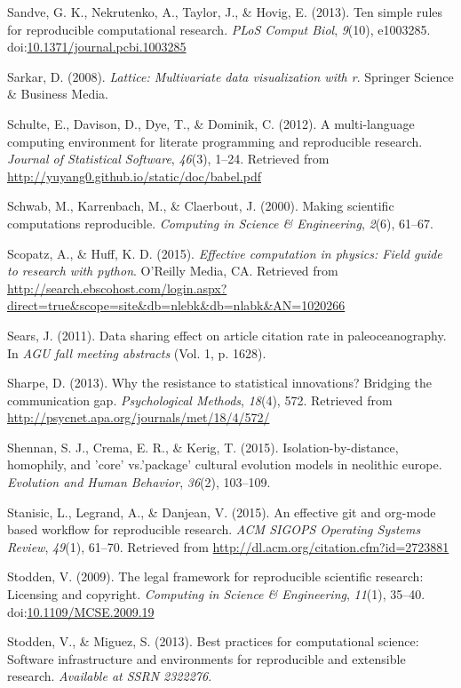 \documentclass[american,man]{apa6}
\begin{document}
Sandve, G. K., Nekrutenko, A., Taylor, J., \& Hovig, E. (2013). Ten
simple rules for reproducible computational research. \emph{PLoS Comput
Biol}, \emph{9}(10), e1003285.
doi:\href{http://dx.doi.org/10.1371/journal.pcbi.1003285}{10.1371/journal.pcbi.1003285}

Sarkar, D. (2008). \emph{Lattice: Multivariate data visualization with
r}. Springer Science \& Business Media.

Schulte, E., Davison, D., Dye, T., \& Dominik, C. (2012). A
multi-language computing environment for literate programming and
reproducible research. \emph{Journal of Statistical Software},
\emph{46}(3), 1--24. Retrieved from
\url{http://yuyang0.github.io/static/doc/babel.pdf}

Schwab, M., Karrenbach, M., \& Claerbout, J. (2000). Making scientific
computations reproducible. \emph{Computing in Science \& Engineering},
\emph{2}(6), 61--67.

Scopatz, A., \& Huff, K. D. (2015). \emph{Effective computation in
physics: Field guide to research with python}. O'Reilly Media, CA.
Retrieved from
\url{http://search.ebscohost.com/login.aspx?direct=true\&scope=site\&db=nlebk\&db=nlabk\&AN=1020266}

Sears, J. (2011). Data sharing effect on article citation rate in
paleoceanography. In \emph{AGU fall meeting abstracts} (Vol. 1, p.
1628).

Sharpe, D. (2013). Why the resistance to statistical innovations?
Bridging the communication gap. \emph{Psychological Methods},
\emph{18}(4), 572. Retrieved from
\url{http://psycnet.apa.org/journals/met/18/4/572/}

Shennan, S. J., Crema, E. R., \& Kerig, T. (2015).
Isolation-by-distance, homophily, and 'core' vs.'package' cultural
evolution models in neolithic europe. \emph{Evolution and Human
Behavior}, \emph{36}(2), 103--109.

Stanisic, L., Legrand, A., \& Danjean, V. (2015). An effective git and
org-mode based workflow for reproducible research. \emph{ACM SIGOPS
Operating Systems Review}, \emph{49}(1), 61--70. Retrieved from
\url{http://dl.acm.org/citation.cfm?id=2723881}

Stodden, V. (2009). The legal framework for reproducible scientific
research: Licensing and copyright. \emph{Computing in Science \&
Engineering}, \emph{11}(1), 35--40.
doi:\href{http://dx.doi.org/10.1109/MCSE.2009.19}{10.1109/MCSE.2009.19}

Stodden, V., \& Miguez, S. (2013). Best practices for computational
science: Software infrastructure and environments for reproducible and
extensible research. \emph{Available at SSRN 2322276}.
\end{document}
